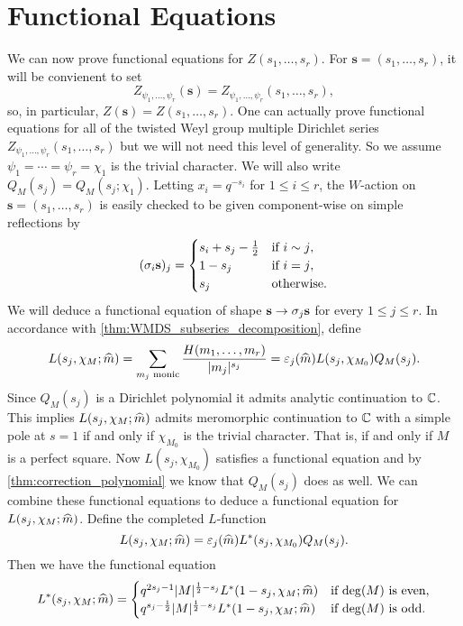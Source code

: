 \documentclass[12pt,reqno,oneside]{amsart}
\begin{document}
\section{Functional Equations}
    We can now prove functional equations for $Z(s_{1},\ldots,s_{r})$. For $\mathbf{s} = (s_{1},\ldots,s_{r})$, it will be convienent to set
    \[
        Z_{\psi_{1},\ldots,\psi_{r}}(\mathbf{s}) = Z_{\psi_{1},\ldots,\psi_{r}}(s_{1},\ldots,s_{r}),
    \]
    so, in particular, $Z(\mathbf{s}) = Z(s_{1},\ldots,s_{r})$. One can actually prove functional equations for all of the twisted Weyl group multiple Dirichlet series $Z_{\psi_{1},\ldots,\psi_{r}}(s_{1},\ldots,s_{r})$ but we will not need this level of generality. So we assume $\psi_{1} = \cdots = \psi_{r} = \chi_{1}$ is the trivial character. We will also write $Q_{M}(s_{j}) = Q_{M}(s_{j};\chi_{1})$. Letting $x_{i} = q^{-s_{i}}$ for $1 \le i \le r$, the $W$-action on $\mathbf{s} = (s_{1},\ldots,s_{r})$ is easily checked to be given component-wise on simple reflections by
    \[
        (\sigma_{i}\mathbf{s})_{j} = \begin{cases} s_{i}+s_{j}-\frac{1}{2} & \text{if $i \sim j$}, \\ 1-s_{j} & \text{if $i = j$}, \\ s_{j} & \text{otherwise}.  \end{cases}
    \]
    We will deduce a functional equation of shape $\mathbf{s} \to \sigma_{j}\mathbf{s}$ for every $1 \le j \le r$. In accordance with \cref{thm:WMDS_subseries_decomposition}, define
    \[
        L(s_{j},\chi_{M};\widehat{m}) = \sum_{\text{$m_{j}$ monic}}\frac{H(m_{1},\ldots,m_{r})}{|m_{j}|^{s_{j}}} = \varepsilon_{j}(\widehat{m})L(s_{j},\chi_{M_{0}})Q_{M}(s_{j}).
    \]
    Since $Q_{M}(s_{j})$ is a Dirichlet polynomial it admits analytic continuation to $\mathbb{C}$. This implies $L(s_{j},\chi_{M};\widehat{m})$ admits meromorphic continuation to $\mathbb{C}$ with a simple pole at $s = 1$ if and only if $\chi_{M_{0}}$ is the trivial character. That is, if and only if $M$ is a perfect square. Now $L(s_{j},\chi_{M_{0}})$ satisfies a functional equation and by \cref{thm:correction_polynomial} we know that $Q_{M}(s_{j})$ does as well. We can combine these functional equations to deduce a functional equation for $L(s_{j},\chi_{M};\widehat{m})$. Define the completed $L$-function
    \[
        L(s_{j},\chi_{M};\widehat{m}) = \varepsilon_{j}(\widehat{m})L^{\ast}(s_{j},\chi_{M_{0}})Q_{M}(s_{j}).
    \]
    Then we have the functional equation
    \[
        L^{\ast}(s_{j},\chi_{M};\widehat{m}) = \begin{cases} q^{2s_{j}-1}|M|^{\frac{1}{2}-s_{j}}L^{\ast}(1-s_{j},\chi_{M};\widehat{m}) & \text{if $\deg(M)$ is even}, \\ q^{s_{j}-\frac{1}{2}}|M|^{\frac{1}{2}-s_{j}}L^{\ast}(1-s_{j},\chi_{M};\widehat{m}) & \text{if $\deg(M)$ is odd}. \end{cases}
    \]
\end{document}
